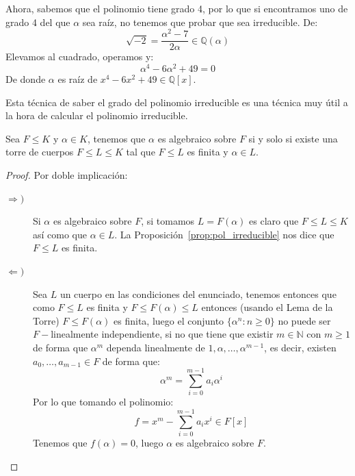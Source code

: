 \begin{ejemplo}
\begin{equation*}
    \end{equation*}
    Ahora, sabemos que el polinomio tiene grado 4, por lo que si encontramos uno de grado 4 del que $\alpha$ sea raíz, no tenemos que probar que sea irreducible. De:
    \begin{equation*}
        \sqrt{-2} = \dfrac{\alpha^2-7}{2\alpha} \in  \mathbb{Q}(\alpha)
    \end{equation*}
    Elevamos al cuadrado, operamos y:
    \begin{equation*}
        \alpha^4 - 6\alpha^2 + 49 = 0
    \end{equation*}
    De donde $\alpha$ es raíz de $x^4-6x^2+49\in \mathbb{Q}[x]$.
\end{ejemplo}

Esta técnica de saber el grado del polinomio irreducible es una técnica muy útil a la hora de calcular el polinomio irreducible.\\


\begin{prop}
    Sea $F\leq K$ y $\alpha\in K$, tenemos que $\alpha$ es algebraico sobre $F$ si y solo si existe una torre de cuerpos $F\leq L \leq K$ tal que $F\leq L$ es finita y $\alpha\in L$.
    \begin{proof}
        Por doble implicación:
        \begin{description}
            \item [$\Longrightarrow )$] Si $\alpha$ es algebraico sobre $F$, si tomamos $L = F(\alpha)$ es claro que $F\leq L\leq K$ así como que $\alpha\in L$. La Proposición~\ref{prop:pol_irreducible} nos dice que $F\leq L$ es finita.
            \item [$\Longleftarrow )$] Sea $L$ un cuerpo en las condiciones del enunciado, tenemos entonces que como $F\leq L$ es finita y $F\leq F(\alpha)\leq L$ entonces (usando el Lema de la Torre) $F\leq F(\alpha)$ es finita, luego el conjunto $\{\alpha^n : n\geq 0\}$ no puede ser $F-$linealmente independiente, si no que tiene que existir $m\in \mathbb{N}$ con $m\geq 1$ de forma que $\alpha^m$ dependa linealmente de $1,\alpha,\ldots,\alpha^{m-1}$, es decir, existen $a_0,\ldots,a_{m-1}\in F$ de forma que:
                \begin{equation*}
                    \alpha^m = \sum_{i=0}^{m-1}a_i \alpha^i
                \end{equation*}
                Por lo que tomando el polinomio:
                \begin{equation*}
                    f = x^m - \sum_{i=0}^{m-1}a_i x^i \in F[x]
                \end{equation*}
                Tenemos que $f(\alpha)=0$, luego $\alpha$ es algebraico sobre $F$.
        \end{description}
    \end{proof}
\end{prop}

